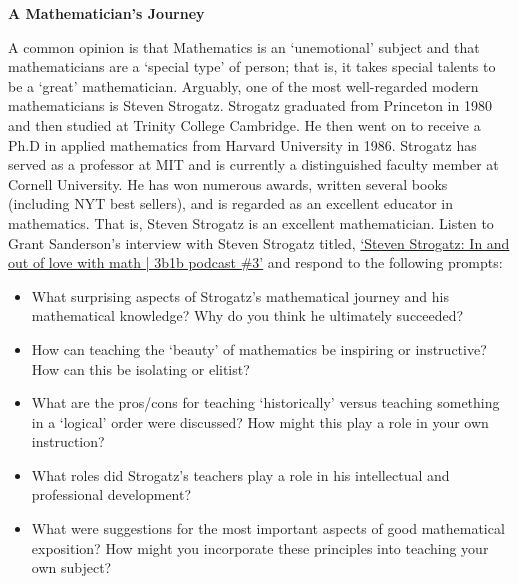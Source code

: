 \documentclass[11pt,letterpaper]{article}
\begin{document}

\begin{center} {\Large \bfseries A Mathematician's Journey} \end{center}

A common opinion is that Mathematics is an `unemotional' subject and that mathematicians are a `special type' of person; that is, it takes special talents to be a `great' mathematician. Arguably, one of the most well-regarded modern mathematicians is Steven Strogatz. Strogatz graduated from Princeton in 1980 and then studied at Trinity College Cambridge. He then went on to receive a Ph.D in applied mathematics from Harvard University in 1986. Strogatz has served as a professor at MIT and is currently a distinguished faculty member at Cornell University. He has won numerous awards, written several books (including  NYT best sellers), and is regarded as an excellent educator in mathematics. That is, Steven Strogatz is an excellent mathematician. Listen to Grant Sanderson's interview with Steven Strogatz titled, \href{https://www.youtube.com/watch?v=SUMLKweFAYk&ab_channel=GrantSanderson}{`Steven Strogatz: In and out of love with math | 3b1b podcast \#3'} and respond to the following prompts:
	\begin{itemize}
	\item What surprising aspects of Strogatz's mathematical journey and his mathematical knowledge? Why do you think he ultimately succeeded?
	\item How can teaching the `beauty' of mathematics be inspiring or instructive? How can this be isolating or elitist? 
	\item What are the pros/cons for teaching `historically' versus teaching something in a `logical' order were discussed? How might this play a role in your own instruction?
	\item What roles did Strogatz's teachers play a role in his intellectual and professional development?
	\item What were suggestions for the most important aspects of good mathematical exposition? How might you incorporate these principles into teaching your own subject?
	\end{itemize}

\newpage

\phantom{.}
\end{document}
